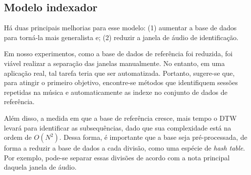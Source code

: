 \subsection{Modelo indexador}

Há duas principais melhorias para esse modelo: (1) aumentar a base de dados para torná-la mais generalista e; (2) reduzir a janela de áudio de identificação.

Em nosso experimentos, como a base de dados de referência foi reduzida, foi viável realizar a separação das janelas manualmente. No entanto, em uma aplicação real, tal tarefa teria que ser automatizada. Portanto, sugere-se que, para atingir o primeiro objetivo, encontre-se métodos que identifiquem sessões repetidas na música e automaticamente as indexe no conjunto de dados de referência.

Além disso, a medida em que a base de referência cresce, mais tempo o DTW levará para identificar as subsequências, dado que sua complexidade está na ordem de $O(N^2)$. Dessa forma, é importante que a base seja pré-processada, de forma a reduzir a base de dados a cada divisão, como uma espécie de \textit{hash table}. Por exemplo, pode-se separar essas divisões de acordo com a nota principal daquela janela de áudio.
